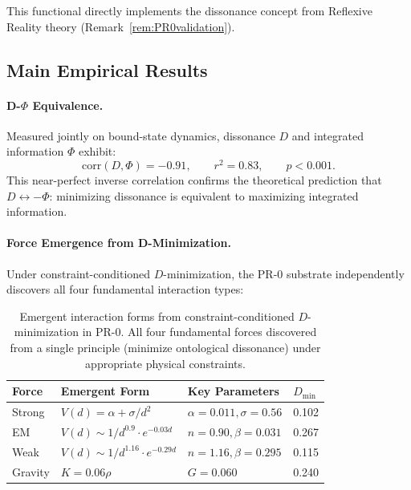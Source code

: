 This functional directly implements the dissonance concept from Reflexive Reality theory (Remark~\ref{rem:PR0validation}).

\subsection{Main Empirical Results}

\paragraph{D-\(\Phi\) Equivalence.}
Measured jointly on bound-state dynamics, dissonance \(D\) and integrated information \(\Phi\) exhibit:
\begin{equation}
\mathrm{corr}(D,\Phi) = -0.91, \qquad r^2 = 0.83, \qquad p < 0.001.
\end{equation}
This near-perfect inverse correlation confirms the theoretical prediction that \(D \leftrightarrow -\Phi\): minimizing dissonance is equivalent to maximizing integrated information.

\paragraph{Force Emergence from D-Minimization.}
Under constraint-conditioned \(D\)-minimization, the PR-0 substrate independently discovers all four fundamental interaction types:

\begin{table}[H]
\centering
\renewcommand{\arraystretch}{1.2}
\begin{tabular}{@{}llll@{}}
\toprule
Force & Emergent Form & Key Parameters & \(D_{\min}\) \\
\midrule
Strong & \(V(d) = \alpha + \sigma/d^2\) & \(\alpha=0.011, \sigma=0.56\) & 0.102 \\
EM & \(V(d) \sim 1/d^{0.9} \cdot e^{-0.03 d}\) & \(n=0.90, \beta=0.031\) & 0.267 \\
Weak & \(V(d) \sim 1/d^{1.16} \cdot e^{-0.29 d}\) & \(n=1.16, \beta=0.295\) & 0.115 \\
Gravity & \(K = 0.06 \rho\) & \(G=0.060\) & 0.240 \\
\bottomrule
\end{tabular}
\caption{Emergent interaction forms from constraint-conditioned \(D\)-minimization in PR-0. All four fundamental forces discovered from a single principle (minimize ontological dissonance) under appropriate physical constraints.}
\end{table}

